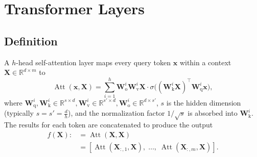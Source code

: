 \section{Transformer Layers}\label{app:transformer_layer}

\subsection{Definition}

\begin{definition}\label{def:attention}
A $h$-head self-attention layer maps every query token $\mathbf{x}$ within a context $\mathbf{X}\in\mathbb R^{d\times m}$ to
\begin{equation*}
\operatorname{Att}(\mathbf{x}, \mathbf{X}) = \sum_{i=1}^{h} \mathbf{W}_{\mathrm o}^i \mathbf{W}_{\mathrm v}^i \mathbf{X} \cdot \sigma\!\big((\mathbf{W}_{\mathrm k}^i \mathbf{X})^\top \mathbf{W}_{\mathrm q}^i \mathbf{x} \big),
\end{equation*}
where $\mathbf{W}^i_{\mathrm q},\mathbf{W}^i_{\mathrm k}\in\mathbb R^{s\times d},\mathbf{W}^i_{\mathrm v}\in\mathbb R^{s'\times d},\mathbf{W}^i_{\mathrm o}\in\mathbb R^{d\times s'}$, $s$ is the hidden dimension (typically $s=s'=\tfrac d h$), and the normalization factor $1/\sqrt{s}$ is absorbed into $\mathbf{W}_{\mathrm k}^i$.  
The results for each token are concatenated to produce the output
\begin{align*}
f(\mathbf X)  \colon &=\operatorname{Att}(\mathbf{X}, \mathbf{X}) \\&= 
[
\operatorname{Att}(\mathbf{X}_{:,1}, \mathbf{X}),\;
\ldots,\;
\operatorname{Att}(\mathbf{X}_{:,m}, \mathbf{X})
].
\end{align*}
\end{definition}

